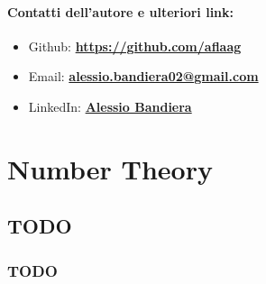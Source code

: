 \documentclass[a4paper, 12pt]{report}
\begin{document}
    \quad

    \subsubsection{Contatti dell'autore e ulteriori link:}
    \begin{itemize}


        \item Github: \textbf{\href{https://github.com/aflaag}{https://github.com/aflaag}}
        \item Email: \textbf{\href{mailto:alessio.bandiera02@gmail.com}{alessio.bandiera02@gmail.com}}
        \item LinkedIn: \textbf{\href{https://www.linkedin.com/in/alessio-bandiera-a53767223/}{Alessio Bandiera}}
    \end{itemize}


    \chapter{Number Theory}
    
    \section{TODO}
    
    \subsection{TODO}
\end{document}
